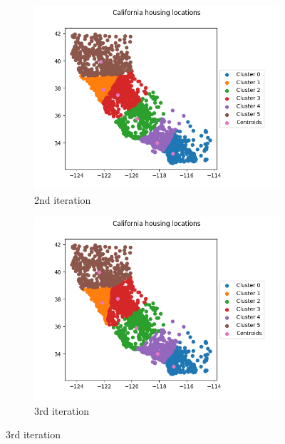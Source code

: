 \documentclass[a4paper]{article}
\begin{document}
\begin{figure}[!htp]
	\begin{subfigure}{0.5\columnwidth}
		\centering
		\includegraphics[width=\textwidth]{images/2.png}
		\caption{2nd iteration}
		\label{figure:iteration-2}
	\end{subfigure}\hfill
	\begin{subfigure}{0.5\columnwidth}
		\centering
		\includegraphics[width=\textwidth]{images/3.png}
		\caption{3rd iteration}
		\label{figure:iteration-3}
	\end{subfigure}
	

\end{figure}
\end{document}
